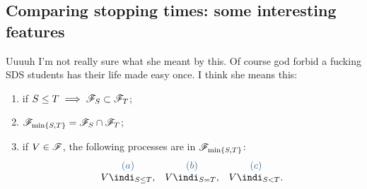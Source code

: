 \documentclass{report}
\begin{document}
\subsection{Comparing stopping times: some interesting features}
Uuuuh I'm not really sure what she meant by this. Of course god forbid a fucking SDS students has their life made easy once. I think she means this:
\begin{theorem}
	\begin{enumerate}[\circnum]
		\item if $S\leq T\implies\mathscr{F}_S\subset\mathscr{F}_T$;
		\item $\mathscr{F}_{\min\{S,T\}}=\mathscr{F}_S\cap\mathscr{F}_T$;
		\item if $V\in\mathscr{F}$, the following processes are in $\mathscr{F}_{\min\{S,T\}}$:
		\begin{equation*}
			\begin{array}{c c c}
				\color{SteelBlue4}(a)&\color{SteelBlue4}(b)&\color{SteelBlue4}(c)\\
				V\indi_{S\leq T},&V\indi_{S=T},&V\indi_{S< T}.
			\end{array}
		\end{equation*}
	\end{enumerate}
\end{theorem}
\end{document}
